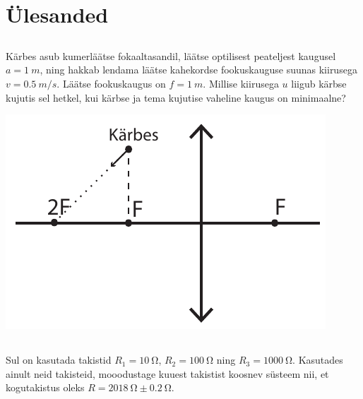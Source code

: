 \documentclass[10pt]{article}
\begin{document}
        \section{Ülesanded}
        \toggleStatement
        \subsection{\protect{}}

\graphicspath{{../probs_b3/}}


Kärbes asub kumerläätse fokaaltasandil, läätse optilisest peateljest kaugusel $a = \SI{1}{m}$, ning hakkab lendama läätse kahekordse fookuskauguse suunas kiirusega $v = \SI{0,5}{m/s}$. Läätse fookuskaugus on $f = \SI{1}{m}$. Millise kiirusega $u$ liigub kärbse kujutis sel hetkel, kui kärbse ja tema kujutise vaheline kaugus on minimaalne?
\begin{center}
	\includegraphics[width = 0.5\linewidth]{2018-lahg-01-yl.pdf}
\end{center}
\probend
\bigskip
\newpage\subsection{\protect{}}


Sul on kasutada takistid $R_1=\SI{10}{\ohm}$, $R_2=\SI{100}{\ohm}$ ning $R_3=\SI{1000}{\ohm}$. Kasutades ainult neid takisteid, mooodustage kuuest takistist koosnev süsteem nii, et kogutakistus oleks $R=\SI{2018}{\ohm}\pm\SI{0,2}{\ohm}$.
\probend
\bigskip

\end{document}
